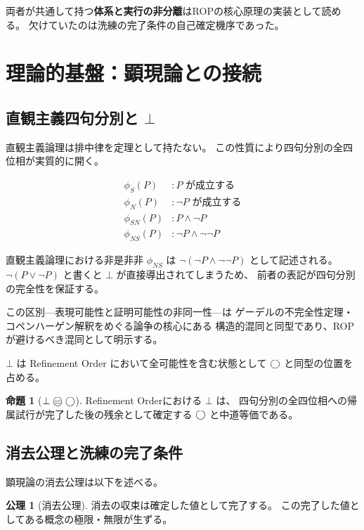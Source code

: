 \documentclass[11pt,a4paper]{ltjsarticle}
\theoremstyle{definition}
\newtheorem{axiom}{公理}[section]
\newtheorem{proposition}{命題}[section]
\begin{document}
両者が共通して持つ\textbf{体系と実行の非分離}はROPの核心原理の実装として読める。
欠けていたのは洗練の完了条件の自己確定機序であった。

\section{理論的基盤：顕現論との接続}

\subsection{直観主義四句分別と $\bot$}

直観主義論理は排中律を定理として持たない。
この性質により四句分別の全四位相が実質的に開く。

\begin{align}
\phi_S(P) &: P \text{ が成立する} \\
\phi_N(P) &: \neg P \text{ が成立する} \\
\phi_{SN}(P) &: P \wedge \neg P \\
\phi_{NS}(P) &: \neg P \wedge \neg\neg P
\end{align}

直観主義論理における非是非非 $\phi_{NS}$ は
$\neg(\neg P \wedge \neg\neg P)$ として記述される。
$\neg(P \vee \neg P)$ と書くと $\bot$ が直接導出されてしまうため、
前者の表記が四句分別の完全性を保証する。

この区別---表現可能性と証明可能性の非同一性---は
ゲーデルの不完全性定理・コペンハーゲン解釈をめぐる論争の核心にある
構造的混同と同型であり、ROPが避けるべき混同として明示する。

$\bot$ は Refinement Order において全可能性を含む状態として
$\bigcirc$ と同型の位置を占める。

\begin{proposition}[$\bot \mweq \dfix$]
Refinement Orderにおける $\bot$ は、
四句分別の全四位相への帰属試行が完了した後の残余として確定する
$\bigcirc$ と中道等価である。
\end{proposition}

\subsection{消去公理と洗練の完了条件}

顕現論の消去公理\cite{Chiba2026_chikaku}は以下を述べる。

\begin{axiom}[消去公理]
消去の収束は確定した値として完了する。
この完了した値としてある概念の極限・無限が生ずる。
\end{axiom}
\end{document}
